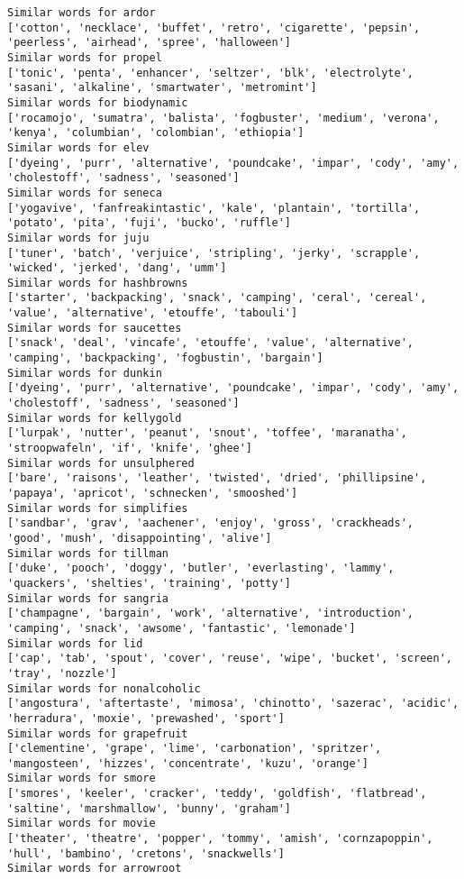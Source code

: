 \documentclass[11pt]{article}
\begin{document}
\begin{Verbatim}[commandchars=\\\{\}]
Similar words for ardor
['cotton', 'necklace', 'buffet', 'retro', 'cigarette', 'pepsin', 'peerless', 'airhead', 'spree', 'halloween']
Similar words for propel
['tonic', 'penta', 'enhancer', 'seltzer', 'blk', 'electrolyte', 'sasani', 'alkaline', 'smartwater', 'metromint']
Similar words for biodynamic
['rocamojo', 'sumatra', 'balista', 'fogbuster', 'medium', 'verona', 'kenya', 'columbian', 'colombian', 'ethiopia']
Similar words for elev
['dyeing', 'purr', 'alternative', 'poundcake', 'impar', 'cody', 'amy', 'cholestoff', 'sadness', 'seasoned']
Similar words for seneca
['yogavive', 'fanfreakintastic', 'kale', 'plantain', 'tortilla', 'potato', 'pita', 'fuji', 'bucko', 'ruffle']
Similar words for juju
['tuner', 'batch', 'verjuice', 'stripling', 'jerky', 'scrapple', 'wicked', 'jerked', 'dang', 'umm']
Similar words for hashbrowns
['starter', 'backpacking', 'snack', 'camping', 'ceral', 'cereal', 'value', 'alternative', 'etouffe', 'tabouli']
Similar words for saucettes
['snack', 'deal', 'vincafe', 'etouffe', 'value', 'alternative', 'camping', 'backpacking', 'fogbustin', 'bargain']
Similar words for dunkin
['dyeing', 'purr', 'alternative', 'poundcake', 'impar', 'cody', 'amy', 'cholestoff', 'sadness', 'seasoned']
Similar words for kellygold
['lurpak', 'nutter', 'peanut', 'snout', 'toffee', 'maranatha', 'stroopwafeln', 'if', 'knife', 'ghee']
Similar words for unsulphered
['bare', 'raisons', 'leather', 'twisted', 'dried', 'phillipsine', 'papaya', 'apricot', 'schnecken', 'smooshed']
Similar words for simplifies
['sandbar', 'grav', 'aachener', 'enjoy', 'gross', 'crackheads', 'good', 'mush', 'disappointing', 'alive']
Similar words for tillman
['duke', 'pooch', 'doggy', 'butler', 'everlasting', 'lammy', 'quackers', 'shelties', 'training', 'potty']
Similar words for sangria
['champagne', 'bargain', 'work', 'alternative', 'introduction', 'camping', 'snack', 'awsome', 'fantastic', 'lemonade']
Similar words for lid
['cap', 'tab', 'spout', 'cover', 'reuse', 'wipe', 'bucket', 'screen', 'tray', 'nozzle']
Similar words for nonalcoholic
['angostura', 'aftertaste', 'mimosa', 'chinotto', 'sazerac', 'acidic', 'herradura', 'moxie', 'prewashed', 'sport']
Similar words for grapefruit
['clementine', 'grape', 'lime', 'carbonation', 'spritzer', 'mangosteen', 'hizzes', 'concentrate', 'kuzu', 'orange']
Similar words for smore
['smores', 'keeler', 'cracker', 'teddy', 'goldfish', 'flatbread', 'saltine', 'marshmallow', 'bunny', 'graham']
Similar words for movie
['theater', 'theatre', 'popper', 'tommy', 'amish', 'cornzapoppin', 'hull', 'bambino', 'cretons', 'snackwells']
Similar words for arrowroot

\end{Verbatim}
\end{document}
